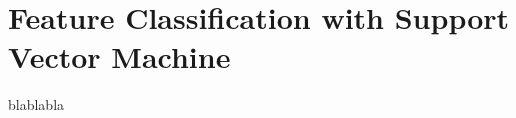 \chapter{Feature Classification with Support Vector Machine}
\label{chap:implementation_svm}

\noindent blablabla
\newline
